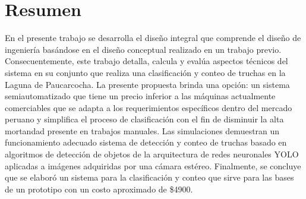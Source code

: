 
\newpage
\clearpage{\pagestyle{empty}\cleardoublepage}
\newpage

\pagestyle{empty}
\newpage
\chapter*{\centering \large Resumen} 

En el presente trabajo se desarrolla el diseño integral que comprende el diseño de ingeniería basándose en el diseño conceptual realizado en un trabajo previo. Consecuentemente, este trabajo detalla, calcula y evalúa aspectos técnicos del sistema en su conjunto que realiza una clasificación y conteo de truchas en la Laguna de Paucarcocha. La presente propuesta brinda una opción: un sistema semiautomatizado que tiene un precio inferior a las máquinas actualmente comerciables que se adapta a los requerimientos específicos dentro del mercado peruano y simplifica el proceso de clasificación con el fin de disminuir la alta mortandad presente en trabajos manuales. Las simulaciones demuestran un funcionamiento adecuado sistema de detección y conteo de truchas basado en algoritmos de detección de objetos de la arquitectura de redes neuronales YOLO aplicadas a imágenes adquiridas por una cámara estéreo. Finalmente, se concluye que se elaboró un sistema para la clasificación y conteo que sirve para las bases de un prototipo con un costo aproximado de \$4900.




